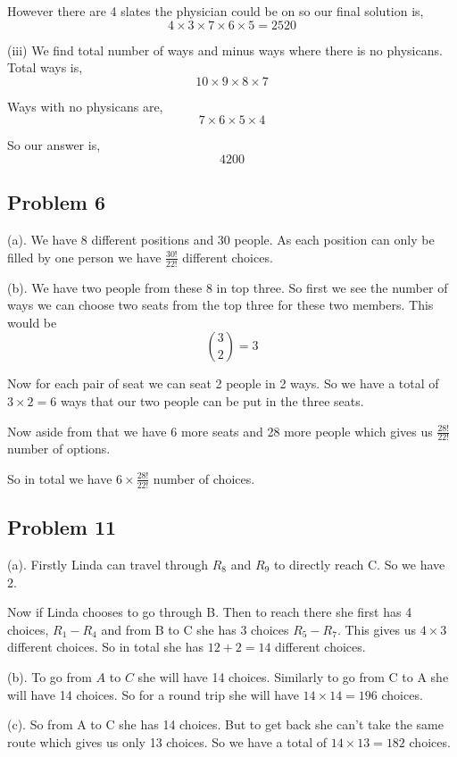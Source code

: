 \documentclass[a4paper]{report}
\begin{document}
However there are 4 slates the physician could be on so our final solution is, 
$$ 4 \times 3 \times 7 \times 6 \times 5 = 2520 $$ 

(iii) We find total number of ways and minus ways where there is no physicans. Total ways is, 
$$ 10 \times  9 \times 8 \times 7 $$ 

Ways with no physicans are, 
$$ 7 \times 6 \times 5 \times 4 $$ 

So our answer is, 
$$ 4200 $$ 


\subsection*{Problem 6}
(a). We have 8 different positions and 30 people. As each position can only be filled by one person we have $\frac{30!}{22!}$ different choices.

(b). We have two people from these 8 in top three. So first we see the number of ways we can choose two seats from the top three for these two members. This would be 
$$ {3 \choose 2 } = 3$$ 

Now for each pair of seat we can seat 2 people in 2 ways. So we have a total of $3 \times 2 = 6$ ways that our two people can be put in the three seats. 

Now aside from that we have 6 more seats and 28 more people which gives us $\frac{28!}{22!}$ number of options.

So in total we have $6 \times \frac{28!}{22!}$ number of choices.

\subsection*{Problem 11}
(a). Firstly Linda can travel through $R_8$ and $R_9$ to directly reach C. So we have 2.

Now if Linda chooses to go through B. Then to reach there she first has 4 choices, $R_1-R_4$ and from B to C she has 3 choices $R_5-R_7$. This gives us $4 \times 3$ different choices. So in total she has $12 + 2 = 14$ different choices.


(b). To go from $A$ to $C$ she will have 14 choices. Similarly to go from C to A she will have 14 choices. So for a round trip  she will have $14 \times 14 = 196$ choices.

(c). So from A to C she has 14 choices. But to get back she can't take the same route which gives us only 13 choices. So we have a total of $14 \times 13 = 182$ choices.
\end{document}
